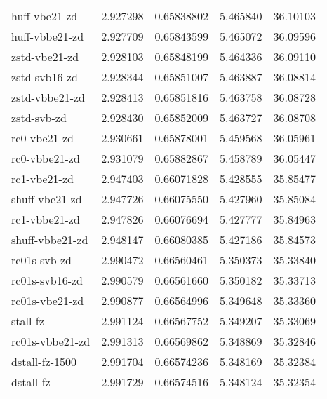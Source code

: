 \begin{tabular}{|l|l|l|l|l|}
      huff-vbe21-zd    &2.927298  & 0.65838802 & 5.465840 & 36.10103\\
     huff-vbbe21-zd    &2.927709  & 0.65843599 & 5.465072 & 36.09596\\
      zstd-vbe21-zd    &2.928103  & 0.65848199 & 5.464336 & 36.09110\\
      zstd-svb16-zd    &2.928344  & 0.65851007 & 5.463887 & 36.08814\\
     zstd-vbbe21-zd    &2.928413  & 0.65851816 & 5.463758 & 36.08728\\
		\rowcolor{gray}
        zstd-svb-zd    &2.928430  & 0.65852009 & 5.463727 & 36.08708\\
		\rowcolor{lightgray}
       rc0-vbe21-zd    &2.930661  & 0.65878001 & 5.459568 & 36.05961\\
		\rowcolor{lightgray}
      rc0-vbbe21-zd    &2.931079  & 0.65882867 & 5.458789 & 36.05447\\
		\rowcolor{lightgray}
       rc1-vbe21-zd    &2.947403  & 0.66071828 & 5.428555 & 35.85477\\
		\rowcolor{lightgray}
     shuff-vbe21-zd    &2.947726  & 0.66075550 & 5.427960 & 35.85084\\
		\rowcolor{lightgray}
      rc1-vbbe21-zd    &2.947826  & 0.66076694 & 5.427777 & 35.84963\\
		\rowcolor{lightgray}
    shuff-vbbe21-zd    &2.948147  & 0.66080385 & 5.427186 & 35.84573\\
	       \hline
		\rowcolor{lightgray}
       rc01s-svb-zd    &2.990472  & 0.66560461 & 5.350373 & 35.33840\\
		\rowcolor{lightgray}
     rc01s-svb16-zd    &2.990579  & 0.66561660 & 5.350182 & 35.33713\\
		\rowcolor{lightgray}
      rc01s-vbe21-zd    &2.990877  & 0.66564996 & 5.349648 & 35.33360\\
		\rowcolor{lightgray}
           stall-fz    &2.991124  & 0.66567752 & 5.349207 & 35.33069\\
		\rowcolor{lightgray}
    rc01s-vbbe21-zd    &2.991313  & 0.66569862 & 5.348869 & 35.32846\\
		\rowcolor{lightgray}
     dstall-fz-1500    &2.991704  & 0.66574236 & 5.348169 & 35.32384\\
		\rowcolor{lightgray}
          dstall-fz    &2.991729  & 0.66574516 & 5.348124 & 35.32354\\
	\hline
    \end{tabular}
